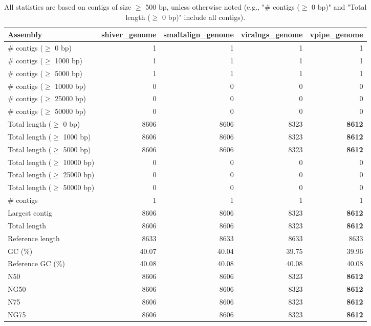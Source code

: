 \documentclass[12pt,a4paper]{article}
\begin{document}
\begin{table}[ht]
\begin{center}
\caption{All statistics are based on contigs of size $\geq$ 500 bp, unless otherwise noted (e.g., "\# contigs ($\geq$ 0 bp)" and "Total length ($\geq$ 0 bp)" include all contigs).}
\begin{tabular}{|l*{4}{|r}|}
\hline
Assembly & shiver\_genome & smaltalign\_genome & viralngs\_genome & vpipe\_genome \\ \hline
\# contigs ($\geq$ 0 bp) & 1 & 1 & 1 & 1 \\ \hline
\# contigs ($\geq$ 1000 bp) & 1 & 1 & 1 & 1 \\ \hline
\# contigs ($\geq$ 5000 bp) & 1 & 1 & 1 & 1 \\ \hline
\# contigs ($\geq$ 10000 bp) & 0 & 0 & 0 & 0 \\ \hline
\# contigs ($\geq$ 25000 bp) & 0 & 0 & 0 & 0 \\ \hline
\# contigs ($\geq$ 50000 bp) & 0 & 0 & 0 & 0 \\ \hline
Total length ($\geq$ 0 bp) & 8606 & 8606 & 8323 & {\bf 8612} \\ \hline
Total length ($\geq$ 1000 bp) & 8606 & 8606 & 8323 & {\bf 8612} \\ \hline
Total length ($\geq$ 5000 bp) & 8606 & 8606 & 8323 & {\bf 8612} \\ \hline
Total length ($\geq$ 10000 bp) & 0 & 0 & 0 & 0 \\ \hline
Total length ($\geq$ 25000 bp) & 0 & 0 & 0 & 0 \\ \hline
Total length ($\geq$ 50000 bp) & 0 & 0 & 0 & 0 \\ \hline
\# contigs & 1 & 1 & 1 & 1 \\ \hline
Largest contig & 8606 & 8606 & 8323 & {\bf 8612} \\ \hline
Total length & 8606 & 8606 & 8323 & {\bf 8612} \\ \hline
Reference length & 8633 & 8633 & 8633 & 8633 \\ \hline
GC (\%) & 40.07 & 40.04 & 39.75 & 39.96 \\ \hline
Reference GC (\%) & 40.08 & 40.08 & 40.08 & 40.08 \\ \hline
N50 & 8606 & 8606 & 8323 & {\bf 8612} \\ \hline
NG50 & 8606 & 8606 & 8323 & {\bf 8612} \\ \hline
N75 & 8606 & 8606 & 8323 & {\bf 8612} \\ \hline
NG75 & 8606 & 8606 & 8323 & {\bf 8612} \\ \hline

\end{tabular}
\end{center}
\end{table}
\end{document}
